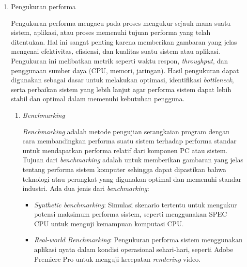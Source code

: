 \documentclass[12pt]{article}
\begin{document}
\begin{enumerate}
    \item {Pengukuran performa}
        \par Pengukuran performa mengacu pada proses mengukur sejauh mana suatu sistem, aplikasi, atau proses memenuhi tujuan performa yang telah ditentukan. Hal ini sangat penting karena memberikan gambaran yang jelas mengenai efektivitas, efisiensi, dan kualitas suatu sistem atau aplikasi. Pengukuran ini melibatkan metrik seperti waktu respon, \textit{throughput}, dan penggunaan sumber daya (CPU, memori, jaringan). Hasil pengukuran dapat digunakan sebagai dasar untuk melakukan optimasi, identifikasi \textit{bottleneck}, serta perbaikan sistem yang lebih lanjut agar performa sistem dapat lebih stabil dan optimal dalam memenuhi kebutuhan pengguna.
        
        \begin{enumerate}
            \item \textit{Benchmarking}
            \par \textit{Benchmarking} adalah metode pengujian serangkaian program dengan cara membandingkan performa suatu sistem terhadap performa standar untuk mendapatkan performa relatif dari komponen PC atau sistem\cite{3.2.4Bhat2021}. Tujuan dari \textit{benchmarking} adalah untuk memberikan gambaran yang jelas tentang performa sistem komputer sehingga dapat dipastikan bahwa teknologi atau perangkat yang digunakan optimal dan memenuhi standar industri. Ada dua jenis dari \textit{benchmarking}:
            \begin{itemize}
                \item \textit{Synthetic benchmarking}: Simulasi skenario tertentu untuk mengukur potensi maksimum performa sistem, seperti menggunakan SPEC CPU untuk menguji kemampuan komputasi CPU.
                \item \textit{Real-world Benchmarking}: Pengukuran performa sistem menggunakan aplikasi nyata dalam kondisi operasional sehari-hari, seperti Adobe Premiere Pro untuk menguji kecepatan \textit{rendering} video.
            \end{itemize}
            

\end{enumerate}
\end{enumerate}
\end{document}
